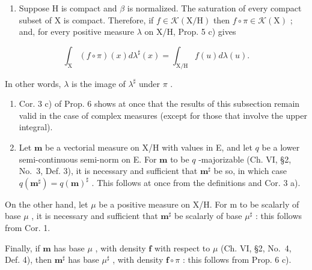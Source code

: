 \begin{enumerate}
\def\labelenumi{\arabic{enumi})}
\setcounter{enumi}{1}
\tightlist
\item
  Suppose H is compact and \(\beta\) is normalized. The saturation of every compact subset of X is compact. Therefore, if \(f \in \mathcal{K}(\mathrm{X}/\mathrm{H})\) then \(f \circ \pi \in \mathcal{K}(\mathrm{X})\) ; and, for every positive measure \(\lambda\) on X/H, Prop. 5 c) gives
\end{enumerate}

\[
\int_ {\mathrm{X}} (f \circ \pi) (x) d \lambda^ {\sharp} (x) = \int_ {\mathrm{X/H}} f (u) d \lambda (u).
\]

In other words, \(\lambda\) is the image of \(\lambda^{\sharp}\) under \(\pi\) .

\begin{enumerate}
\def\labelenumi{\arabic{enumi})}
\setcounter{enumi}{2}
\item
  Cor. 3 c) of Prop. 6 shows at once that the results of this subsection remain valid in the case of complex measures (except for those that involve the upper integral).
\item
  Let \(\mathbf{m}\) be a vectorial measure on X/H with values in E, and let \(q\) be a lower semi-continuous semi-norm on E. For \(\mathbf{m}\) to be \(q\) -majorizable (Ch. VI, §2, No.~3, Def. 3), it is necessary and sufficient that \(\mathbf{m}^{\sharp}\) be so, in which case \(q(\mathbf{m}^{\sharp}) = q(\mathbf{m})^{\sharp}\) . This follows at once from the definitions and Cor. 3 a).
\end{enumerate}

On the other hand, let \(\mu\) be a positive measure on X/H. For m to be scalarly of base \(\mu\) , it is necessary and sufficient that \(\mathbf{m}^{\sharp}\) be scalarly of base \(\mu^{\sharp}\) : this follows from Cor. 1.

Finally, if \(\mathbf{m}\) has base \(\mu\) , with density \(\mathbf{f}\) with respect to \(\mu\) (Ch. VI, §2, No.~4, Def. 4), then \(\mathbf{m}^{\sharp}\) has base \(\mu^{\sharp}\) , with density \(\mathbf{f} \circ \pi\) : this follows from Prop. 6 c).

